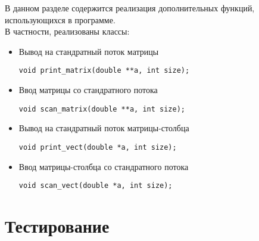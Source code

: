 \documentclass[a4paper,12pt,titlepage,finall]{article}
\begin{document}
\begin{itemize}
\begin{lstlisting}
\end{lstlisting}

\newpage


В данном разделе содержится реализация дополнительных функций, использующихся в программе. \\
В частности, реализованы классы:
\begin{itemize}
\item Вывод на стандратный поток матрицы
\begin{lstlisting}
void print_matrix(double **a, int size);
\end{lstlisting}

\item Ввод матрицы со стандратного потока 
\begin{lstlisting}
void scan_matrix(double **a, int size);
\end{lstlisting}

\item Вывод на стандратный поток матрицы-столбца
\begin{lstlisting}
void print_vect(double *a, int size);
\end{lstlisting}

\item Ввод матрицы-столбца со стандратного потока 
\begin{lstlisting}
void scan_vect(double *a, int size);
\end{lstlisting}

\end{itemize}

\end{itemize}

\newpage
\section{Тестирование}
\end{document}
